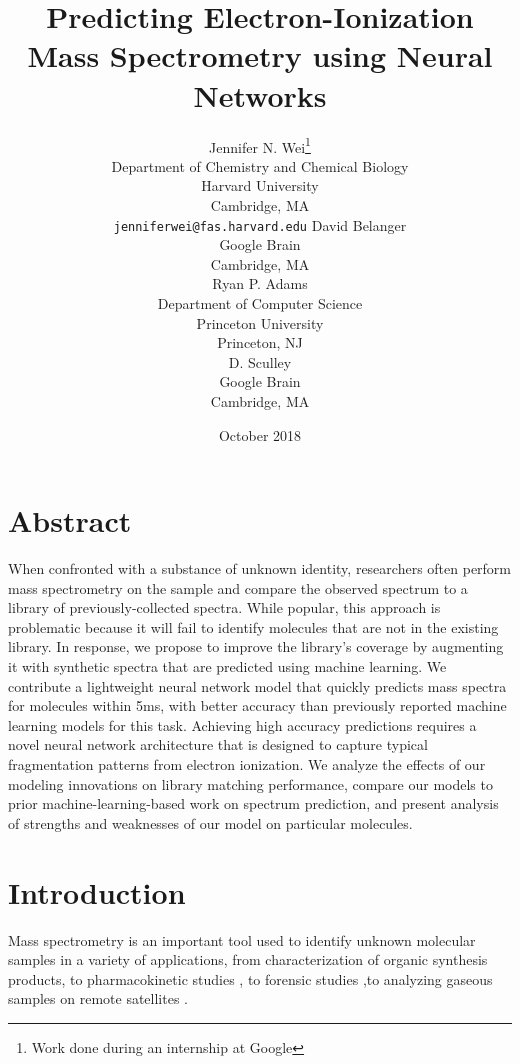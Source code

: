 \documentclass{article}
\title{Predicting Electron-Ionization Mass Spectrometry using Neural Networks}
\author{ Jennifer N. Wei\thanks{Work done during an internship at Google} \\
  Department of Chemistry and Chemical Biology\\
  Harvard University\\
  Cambridge, MA \\
  \texttt{jenniferwei@fas.harvard.edu} 
  \And
  David Belanger \\
  Google Brain \\
  Cambridge, MA\\
  \textt{dbelanger@google.com}
  \And
  Ryan P. Adams \\
  Department of Computer Science\\
  Princeton University\\
  Princeton, NJ\\
  \textt{rpa@princeton.edu}
  \And
  D. Sculley \\
  Google Brain\\
  Cambridge, MA\\
  \textt{dsculley@google.com}
  }
\date{October 2018}
\begin{document}
\maketitle

\section*{Abstract}
When confronted with a substance of unknown identity, researchers often perform mass spectrometry on the sample and compare the observed spectrum to a library of previously-collected spectra. While popular, this approach is problematic because it will fail to identify molecules that are not in the existing library. In response, we propose to improve the library's coverage by augmenting it with synthetic spectra that are predicted using machine learning. We contribute a lightweight neural network model that quickly predicts mass spectra for molecules within 5ms, with better accuracy than previously reported machine learning models for this task. Achieving high accuracy predictions requires a novel neural network architecture that is designed to capture typical fragmentation patterns from electron ionization. We analyze the effects of our modeling innovations on library matching performance, compare our models to prior machine-learning-based work on spectrum prediction, and present analysis of strengths and weaknesses of our model on particular molecules.


\section{Introduction}

Mass spectrometry is an important tool used to identify unknown molecular samples in a variety of applications, from characterization of organic synthesis products, to pharmacokinetic studies \cite{massspec_pharmakinetics}, to forensic studies \cite{Zhou2017LatentFingerprints},to analyzing gaseous samples on remote satellites \cite{Petrie_ions_in_space}.
\end{document}
